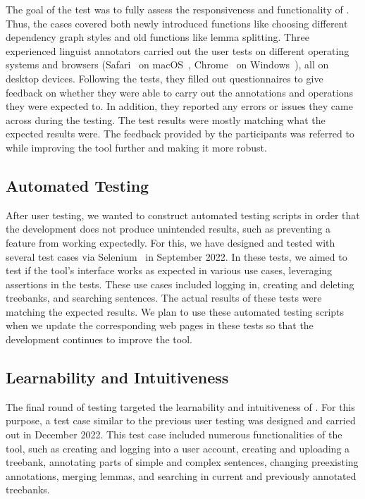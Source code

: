 The goal of the test was to fully assess the responsiveness and functionality of \boatvtwo.
Thus, the cases covered both newly introduced functions like choosing different dependency graph styles and old functions like lemma splitting.
Three experienced linguist annotators carried out the user tests on different operating systems and browsers (Safari~\cite{safari} on macOS~\cite{macos}, Chrome~\cite{chrome} on Windows~\cite{windows}), all on desktop devices.
Following the tests, they filled out questionnaires to give feedback on whether they were able to carry out the annotations and operations they were expected to.
In addition, they reported any errors or issues they came across during the testing.
The test results were mostly matching what the expected results were.
The feedback provided by the participants was referred to while improving the tool further and making it more robust.

\subsection{Automated Testing}
After user testing, we wanted to construct automated testing scripts in order that the development does not produce unintended results, such as preventing a feature from working expectedly.
For this, we have designed and tested with several test cases via Selenium~\cite{selenium} in September 2022.
In these tests, we aimed to test if the tool's interface works as expected in various use cases, leveraging assertions in the tests.
These use cases included logging in, creating and deleting treebanks, and searching sentences.
The actual results of these tests were matching the expected results.
We plan to use these automated testing scripts when we update the corresponding web pages in these tests so that the development continues to improve the tool.

\subsection{Learnability and Intuitiveness}
The final round of testing targeted the learnability and intuitiveness of \boatvtwo.
For this purpose, a test case similar to the previous user testing was designed and carried out in December 2022.
This test case included numerous functionalities of the tool, such as creating and logging into a user account, creating and uploading a treebank, annotating parts of simple and complex sentences, changing preexisting annotations, merging lemmas, and searching in current and previously annotated treebanks.

